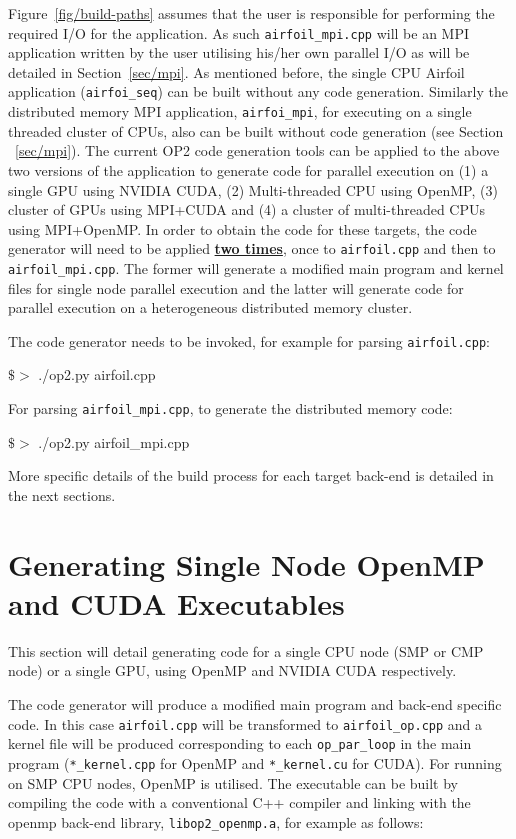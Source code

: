 \documentclass[11pt]{article}
\begin{document}
\noindent Figure~\ref{fig/build-paths} assumes that the user is responsible for performing the required I/O for the
application. As such \texttt{airfoil\_mpi.cpp} will be an MPI application written by the user utilising his/her own
parallel I/O as will be detailed in Section~\ref{sec/mpi}. As mentioned before, the single CPU Airfoil application
(\texttt{airfoi\_seq}) can be built without any code generation. Similarly the distributed memory MPI application,
\texttt{airfoi\_mpi}, for executing on a single threaded cluster of CPUs, also can be built without code generation
(see Section ~\ref{sec/mpi}). The current OP2 code generation tools can be applied to the above two versions of the
application to generate code for parallel execution on (1) a single GPU using NVIDIA CUDA, (2) Multi-threaded CPU using
OpenMP, (3) cluster of GPUs using MPI+CUDA and (4) a cluster of multi-threaded CPUs using MPI+OpenMP. In order to obtain
the code for these targets, the code generator will need to be applied \underline{\textbf{two times}}, once to
\texttt{airfoil.cpp} and then to \texttt{airfoil\_mpi.cpp}. The former will generate a modified main program and
kernel files for single node parallel execution and the latter will generate code for parallel execution on a
heterogeneous distributed memory cluster. 

\noindent The code generator needs to be invoked, for example for parsing \texttt{airfoil.cpp}:

$\$>$ ./op2.py airfoil.cpp

\noindent For parsing \texttt{airfoil\_mpi.cpp}, to generate the distributed memory code:

$\$>$ ./op2.py airfoil\_mpi.cpp

\noindent More specific details of the build process for each target back-end is detailed in the next sections. 

\newpage
\section{Generating Single Node OpenMP and CUDA Executables}\label{sec/cuda_openmp}
This section will detail generating code for a single CPU node (SMP or CMP node) or a single GPU, using OpenMP and
NVIDIA CUDA respectively. 

The code generator will produce a modified main program and back-end specific code. In this case \texttt{airfoil.cpp}
will be transformed to \texttt{airfoil\_op.cpp} and a kernel file will be produced corresponding to each
\texttt{op\_par\_loop} in the main program (\texttt{*\_kernel.cpp} for OpenMP and \texttt{*\_kernel.cu} for CUDA). For
running on SMP CPU nodes, OpenMP is utilised. The executable can be built by compiling the code with a conventional C++
compiler and linking with the openmp back-end library, \texttt{libop2\_openmp.a}, for example as follows:
\end{document}
